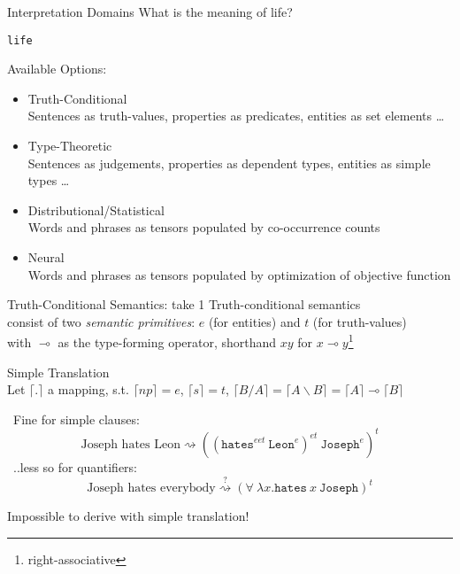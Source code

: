 \documentclass{beamer}
\newcommand{\term}[1]{\texttt{#1}}
\newcommand{\li}{\!\multimap\!}
\newcommand{\trans}[1]{\lceil #1 \rceil}
\begin{document}
\begin{frame}{Interpretation Domains}
	\small
	What is the meaning of life?
	\pause
	\begin{flushright}
		\texttt{life}
	\end{flushright}

	\pause
	Available Options:
	\begin{itemize}
		\item Truth-Conditional \\
		{\footnotesize Sentences as truth-values, properties as predicates, entities as set elements \dots}
		\item Type-Theoretic \\
		{\footnotesize Sentences as judgements, properties as dependent types, entities as simple types \dots}
		\item Distributional/Statistical \\
		{\footnotesize Words and phrases as tensors populated by co-occurrence counts}
		\item Neural \\
		{\footnotesize Words and phrases as tensors populated by optimization of objective function}
	\end{itemize}
\end{frame}

\begin{frame}{Truth-Conditional Semantics: take 1}
	\small
	\alert{Truth-conditional semantics}\\
	consist of two \textit{semantic primitives}: $e$ (for entities) and $t$ (for truth-values)\\
	with $\li$ as the type-forming operator, shorthand $xy$ for $x\li y$\footnote{right-associative}
	\vfill	
	
	\pause
	\alert{Simple Translation}\\
	Let $\trans{.}$ a mapping, s.t. $\trans{np} = e$, $\trans{s} = t$, $\trans{B/A} = \trans{A\backslash B} = \trans{A} \li \trans{B}$
	\vfill
	
	\pause
	\smiley \ Fine for simple clauses:
	\[
		\text{Joseph hates Leon} \rightsquigarrow ((\term{hates}^{eet} \ \term{Leon}^{e})^{et} \ \term{Joseph}^e)^t
	\]
	\pause
	\frownie \ ..less so for quantifiers:
	\[
		\text{Joseph hates everybody} \stackrel{?}{\rightsquigarrow} (\forall \ \lambda x.\term{hates} \ x  \ \term{Joseph})^t
	\]
	\begin{flushright}
		Impossible to derive with simple translation!
	\end{flushright}
	
\end{frame}
\end{document}

